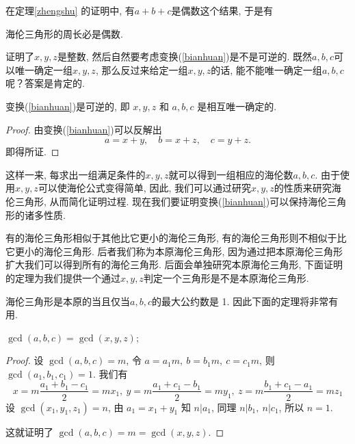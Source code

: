 \documentclass[12pt]{article}
\begin{document}
在定理\ref{zhengshu} 的证明中, 有$a+b+c$是偶数这个结果, 于是有

\begin{corollary}
海伦三角形的周长必是偶数. 
\end{corollary}

证明了$x,y,z$是整数, 然后自然要考虑变换(\ref{bianhuan})是不是可逆的. 既然$a,b,c$可以唯一确定一组$x,y,z$, 那么反过来给定一组$x,y,z$的话, 能不能唯一确定一组$a,b,c$呢？答案是肯定的. 
   
\begin{theorem}
    变换\rm(\ref{bianhuan})是可逆的, 即 $x,y,z$ 和 $a,b,c$ 是相互唯一确定的. 
\end{theorem}
    
\begin{proof}
    由变换(\ref{bianhuan})可以反解出
    \begin{equation}\label{nibianhuan}
        a=x+y, \quad b=x+z, \quad c=y+z.
    \end{equation}
即得所证. 
\end{proof}

这样一来, 每求出一组满足条件的$x,y,z$就可以得到一组相应的海伦数$a,b,c$. 由于使用$x,y,z$可以使海伦公式变得简单, 因此, 我们可以通过研究$x,y,z$的性质来研究海伦三角形, 从而简化证明过程. 现在我们要证明变换(\ref{bianhuan})可以保持海伦三角形的诸多性质. 

有的海伦三角形相似于其他比它更小的海伦三角形, 有的海伦三角形则不相似于比它更小的海伦三角形. 后者我们称为本原海伦三角形, 因为通过把本原海伦三角形扩大我们可以得到所有的海伦三角形. 后面会单独研究本原海伦三角形, 下面证明的定理为我们提供一个通过$x,y,z$判定一个三角形是不是本原海伦三角形. 

海伦三角形是本原的当且仅当$a,b,c$的最大公约数是 1. 因此下面的定理将非常有用. 
    
\begin{theorem}
    $\gcd(a,b,c)=\gcd(x,y,z)$; 
\end{theorem}
\begin{proof}
    设 $\gcd(a,b,c)=m$, 令 $a=a_1m,\ b=b_1m,\ c=c_1m$, 则 $\gcd(a_1,b_1,c_1)=1$. 我们有
    \begin{equation}
        x=m\frac{a_1+b_1-c_1}{2}=mx_1,\ y=m\frac{a_1+c_1-b_1}{2}=my_1,\ z=m\frac{b_1+c_1-a_1}{2}=mz_1
    \end{equation}
    设 $\gcd(x_1,y_1,z_1)=n$, 由 $a_1=x_1+y_1$ 知 $n|a_1$, 同理 $n|b_1,\ n|c_1$, 所以 $n=1$. \par
    这就证明了 $\gcd(a,b,c)=m=\gcd(x,y,z)$.
\end{proof}
\end{document}
